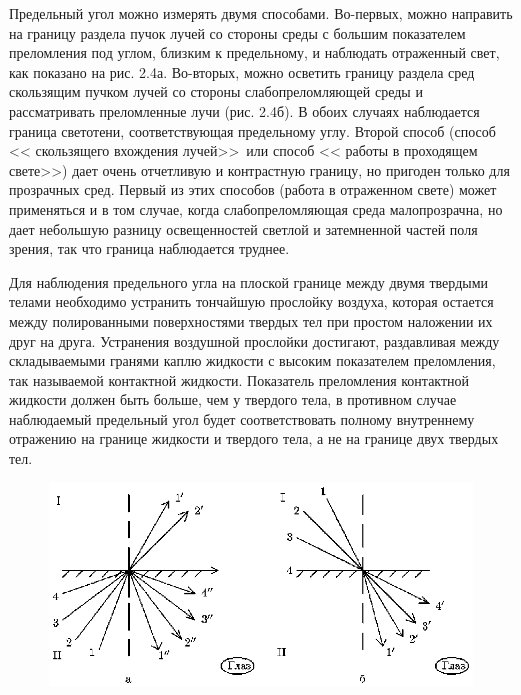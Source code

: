 Предельный угол можно измерять двумя способами. Во-первых, можно
направить на границу раздела пучок лучей со стороны среды с
большим показателем преломления под углом, близким к предельному,
и наблюдать отраженный свет, как показано на рис. 2.4а. Во-вторых,
можно осветить границу раздела сред скользящим пучком лучей со
стороны слабопреломляющей среды и рассматривать преломленные лучи
(рис. 2.4б). В обоих случаях наблюдается граница светотени,
соответствующая предельному углу. Второй способ (способ <<
скользящего вхождения лучей>>\ или способ << работы в проходящем
свете>>) дает очень отчетливую и контрастную границу, но пригоден
только для прозрачных сред. Первый из этих способов (работа в
отраженном свете) может применяться и в том случае, когда
слабопреломляющая среда малопрозрачна, но дает небольшую разницу
освещенностей светлой и затемненной частей поля зрения, так что
граница наблюдается труднее.

Для наблюдения предельного угла на плоской границе между двумя
твердыми телами необходимо устранить тончайшую прослойку воздуха,
которая остается между полированными поверхностями твердых тел при
простом наложении их друг на друга. Устранения воздушной прослойки
достигают, раздавливая между складываемыми гранями каплю жидкости
с высоким показателем преломления, так называемой контактной
жидкости. Показатель преломления контактной жидкости должен быть
больше, чем у твердого тела, в противном случае наблюдаемый
предельный угол будет соответствовать полному внутреннему
отражению на границе жидкости и твердого тела, а не на границе
двух твердых тел.

\begin{figure}[tbp]
\centerline{\hbox{\includegraphics[scale=0.7]{Ris/ris_eps/ris2_04.eps}}}


\end{figure}

